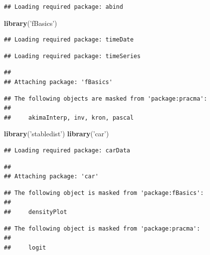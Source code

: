 \documentclass[]{article}
\newenvironment{Shaded}{\begin{snugshade}}{\end{snugshade}}
\newcommand{\KeywordTok}[1]{\textcolor[rgb]{0.13,0.29,0.53}{\textbf{#1}}}
\newcommand{\NormalTok}[1]{#1}
\newcommand{\StringTok}[1]{\textcolor[rgb]{0.31,0.60,0.02}{#1}}
\begin{document}
\begin{verbatim}
## Loading required package: abind
\end{verbatim}

\begin{Shaded}
\begin{Highlighting}[]
\KeywordTok{library}\NormalTok{(}\StringTok{'fBasics'}\NormalTok{)}
\end{Highlighting}
\end{Shaded}

\begin{verbatim}
## Loading required package: timeDate
\end{verbatim}

\begin{verbatim}
## Loading required package: timeSeries
\end{verbatim}

\begin{verbatim}
## 
## Attaching package: 'fBasics'
\end{verbatim}

\begin{verbatim}
## The following objects are masked from 'package:pracma':
## 
##     akimaInterp, inv, kron, pascal
\end{verbatim}

\begin{Shaded}
\begin{Highlighting}[]
\KeywordTok{library}\NormalTok{(}\StringTok{'stabledist'}\NormalTok{)}
\KeywordTok{library}\NormalTok{(}\StringTok{'car'}\NormalTok{)}
\end{Highlighting}
\end{Shaded}

\begin{verbatim}
## Loading required package: carData
\end{verbatim}

\begin{verbatim}
## 
## Attaching package: 'car'
\end{verbatim}

\begin{verbatim}
## The following object is masked from 'package:fBasics':
## 
##     densityPlot
\end{verbatim}

\begin{verbatim}
## The following object is masked from 'package:pracma':
## 
##     logit
\end{verbatim}
\end{document}

